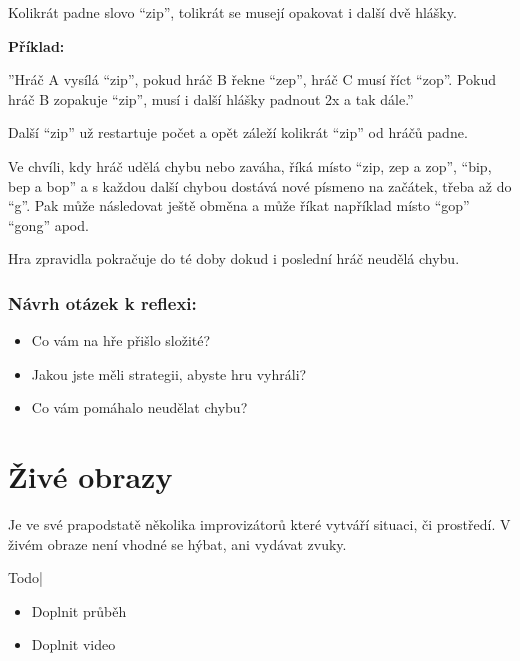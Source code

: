 Kolikrát padne slovo “zip”, tolikrát se musejí opakovat i další dvě hlášky. 
 
 
\textbf{Příklad:}{}

 
''Hráč A vysílá “zip”, pokud hráč B řekne “zep”, hráč C musí říct “zop”. 
Pokud hráč B zopakuje “zip”, musí i další hlášky padnout 2x a tak dále.''  
 
 
Další “zip” už restartuje počet a opět záleží kolikrát “zip” od hráčů padne. 
 
Ve chvíli, kdy hráč udělá chybu nebo zaváha, říká místo “zip, zep a zop”, “bip, bep a bop” a s každou další chybou dostává nové písmeno na začátek, třeba až do “g”. Pak může následovat ještě obměna a může říkat například místo “gop” “gong” apod. 
 
Hra zpravidla pokračuje do té doby dokud i poslední hráč neudělá chybu. 
 
\subsubsection{Návrh otázek k reflexi:} \begin{itemize}
\item  Co vám na hře přišlo složité?
\item  Jakou jste měli strategii, abyste hru vyhráli?
\item  Co vám pomáhalo neudělat chybu?
\end{itemize}
 
 
 
 
 
 
 
 
 
\needspace{5cm} \section{Živé obrazy} \label{živé obrazy}  
 
Je ve své prapodstatě  několika improvizátorů které vytváří situaci, či prostředí. V živém obraze není vhodné se hýbat, ani vydávat zvuky. 
 
{{Todo| 
\begin{itemize}
\item  Doplnit průběh
\item  Doplnit video
\end{itemize}
}} 
 
 
 
 
